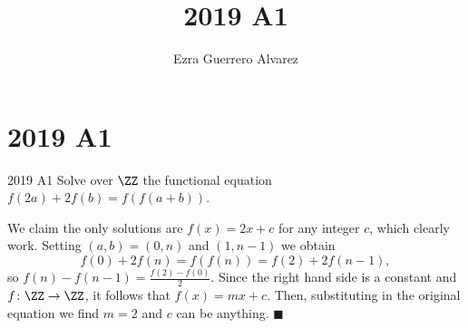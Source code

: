 \documentclass[14pt]{article}
\title{2019 A1}
\author{Ezra Guerrero Alvarez}
\begin{document}
\maketitle
	
\section*{2019 A1}

\begin{statement}{2019 A1}
	Solve over $\ZZ$ the functional equation
	$f(2a) + 2f(b) = f(f(a+b))$.
\end{statement}
We claim the only solutions are $f(x)=2x+c$ for any integer $c$, which clearly work. Setting $(a,b)=(0,n)$ and $(1,n-1)$ we obtain
\[ f(0)+2f(n)=f(f(n))=f(2)+2f(n-1), \]
so $f(n)-f(n-1)=\frac{f(2)-f(0)}2$. Since the right hand side is a constant and $f\colon\ZZ\rightarrow\ZZ$, it follows that $f(x)=mx+c$. Then, substituting in the original equation we find $m=2$ and $c$ can be anything. $\blacksquare$
	
\end{document}
